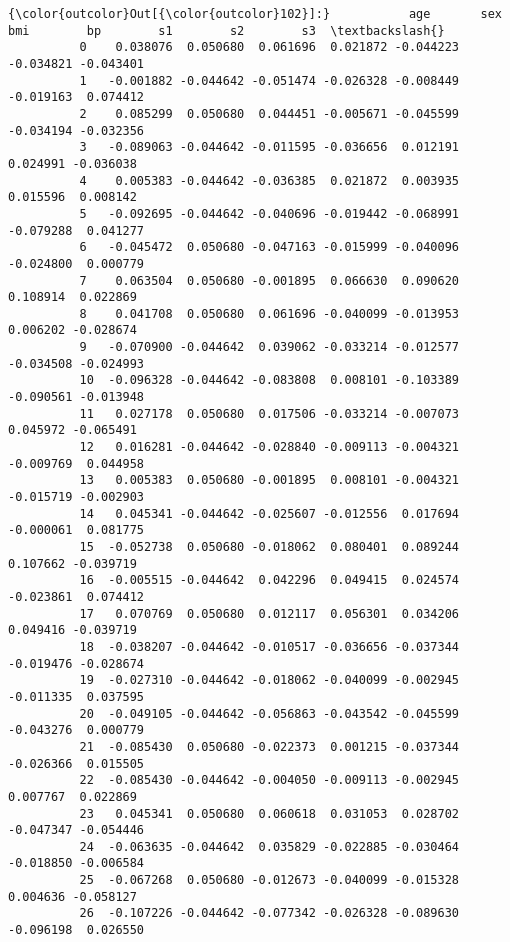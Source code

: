 \documentclass[11pt]{article}
\begin{document}
\begin{Verbatim}[commandchars=\\\{\}]
{\color{outcolor}Out[{\color{outcolor}102}]:}           age       sex       bmi        bp        s1        s2        s3  \textbackslash{}
          0    0.038076  0.050680  0.061696  0.021872 -0.044223 -0.034821 -0.043401   
          1   -0.001882 -0.044642 -0.051474 -0.026328 -0.008449 -0.019163  0.074412   
          2    0.085299  0.050680  0.044451 -0.005671 -0.045599 -0.034194 -0.032356   
          3   -0.089063 -0.044642 -0.011595 -0.036656  0.012191  0.024991 -0.036038   
          4    0.005383 -0.044642 -0.036385  0.021872  0.003935  0.015596  0.008142   
          5   -0.092695 -0.044642 -0.040696 -0.019442 -0.068991 -0.079288  0.041277   
          6   -0.045472  0.050680 -0.047163 -0.015999 -0.040096 -0.024800  0.000779   
          7    0.063504  0.050680 -0.001895  0.066630  0.090620  0.108914  0.022869   
          8    0.041708  0.050680  0.061696 -0.040099 -0.013953  0.006202 -0.028674   
          9   -0.070900 -0.044642  0.039062 -0.033214 -0.012577 -0.034508 -0.024993   
          10  -0.096328 -0.044642 -0.083808  0.008101 -0.103389 -0.090561 -0.013948   
          11   0.027178  0.050680  0.017506 -0.033214 -0.007073  0.045972 -0.065491   
          12   0.016281 -0.044642 -0.028840 -0.009113 -0.004321 -0.009769  0.044958   
          13   0.005383  0.050680 -0.001895  0.008101 -0.004321 -0.015719 -0.002903   
          14   0.045341 -0.044642 -0.025607 -0.012556  0.017694 -0.000061  0.081775   
          15  -0.052738  0.050680 -0.018062  0.080401  0.089244  0.107662 -0.039719   
          16  -0.005515 -0.044642  0.042296  0.049415  0.024574 -0.023861  0.074412   
          17   0.070769  0.050680  0.012117  0.056301  0.034206  0.049416 -0.039719   
          18  -0.038207 -0.044642 -0.010517 -0.036656 -0.037344 -0.019476 -0.028674   
          19  -0.027310 -0.044642 -0.018062 -0.040099 -0.002945 -0.011335  0.037595   
          20  -0.049105 -0.044642 -0.056863 -0.043542 -0.045599 -0.043276  0.000779   
          21  -0.085430  0.050680 -0.022373  0.001215 -0.037344 -0.026366  0.015505   
          22  -0.085430 -0.044642 -0.004050 -0.009113 -0.002945  0.007767  0.022869   
          23   0.045341  0.050680  0.060618  0.031053  0.028702 -0.047347 -0.054446   
          24  -0.063635 -0.044642  0.035829 -0.022885 -0.030464 -0.018850 -0.006584   
          25  -0.067268  0.050680 -0.012673 -0.040099 -0.015328  0.004636 -0.058127   
          26  -0.107226 -0.044642 -0.077342 -0.026328 -0.089630 -0.096198  0.026550   

\end{Verbatim}
\end{document}

